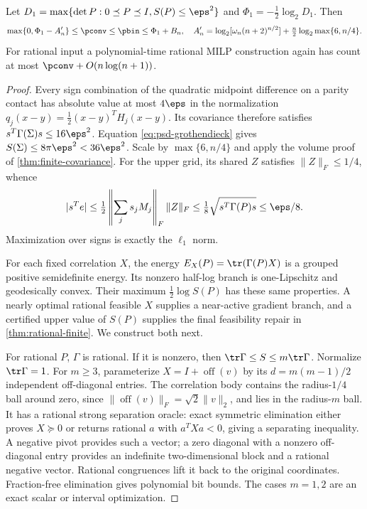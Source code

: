 \begin{theorem}\label{thm:l1-covariance}
Let $D_1=\max\{\det P:0\preceq P\preceq I,S(P)\le\eps^2\}$ and
$\Phi_1=-\frac12\log_2D_1$. Then
\[
 \max\{0,\Phi_1-A'_n\}\le\pconv\le\pbin\le\Phi_1+B_n,
 \quad
 A'_n=\log_2[\omega_n(n+2)^{n/2}]
              +\tfrac n2\log_2\max\{6,n/4\}.
\]
For rational input a polynomial-time rational MILP construction again
has count at most $\pconv+O(n\log(n+1))$.
\end{theorem}
\begin{proof}
Every sign combination of the quadratic midpoint difference on a parity
contact has absolute value at most $4\eps$ in the normalization
$q_j(x-y)=\frac12(x-y)^TH_j(x-y)$. Its covariance therefore satisfies
$s^T\Gamma(\Sigma)s\le16\eps^2$. Equation \eqref{eq:psd-grothendieck}
gives $S(\Sigma)\le8\pi\eps^2<36\eps^2$. Scale by $\max\{6,n/4\}$
and apply the volume proof of \cref{thm:finite-covariance}.
For the upper grid, its shared $Z$ satisfies $\|Z\|_F\le1/4$, whence
\[
 |s^Te|\le\tfrac12\left\|\sum_j s_jM_j\right\|_F\|Z\|_F
 \le\tfrac18\sqrt{s^T\Gamma(P)s}\le\eps/8.
\]
Maximization over signs is exactly the $\ell_1$ norm.

For each fixed correlation $X$, the energy
$E_X(P)=\tr(\Gamma(P)X)$ is a grouped positive semidefinite energy.
Its nonzero half-log branch is one-Lipschitz and geodesically convex.
Their maximum $\frac12\log S(P)$ has these same properties. A nearly
optimal rational feasible $X$ supplies a near-active gradient branch,
and a certified upper value of $S(P)$ supplies the final feasibility
repair in \cref{thm:rational-finite}. We construct both next.

For rational $P$, $\Gamma$ is rational. If it is nonzero, then
$\tr\Gamma\le S\le m\tr\Gamma$. Normalize $\tr\Gamma=1$. For $m\ge3$,
parameterize $X=I+\operatorname{off}(v)$ by its $d=m(m-1)/2$ independent
off-diagonal entries. The correlation body contains the radius-$1/4$
ball around zero, since $\|\operatorname{off}(v)\|_F=\sqrt2\|v\|_2$,
and lies in the radius-$m$ ball. It has a rational strong separation
oracle: exact symmetric elimination either proves $X\succeq0$ or
returns rational $a$ with $a^TXa<0$, giving a separating inequality.
A negative pivot provides such a vector; a zero diagonal with a nonzero
off-diagonal entry provides an indefinite two-dimensional block and a
rational negative vector. Rational congruences lift it back to the original
coordinates. Fraction-free elimination gives polynomial bit bounds.
The cases $m=1,2$ are an exact scalar or interval optimization.


\end{proof}
